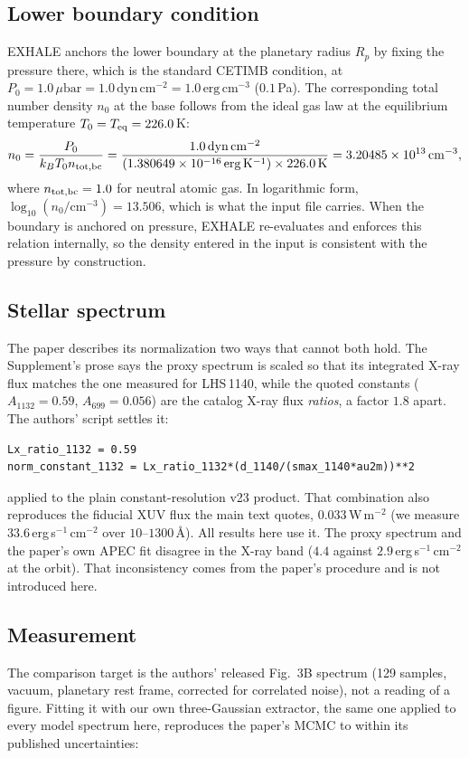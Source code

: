 \documentclass[english,a4paper]{my_memo}
\begin{document}
\subsection{Lower boundary condition}
\label{sec:base_bc}
EXHALE anchors the lower boundary at the planetary radius $R_p$ by fixing the
pressure there, which is the standard CETIMB condition, at
$P_0 = 1.0\,\mu\mathrm{bar} = 1.0\,\mathrm{dyn\,cm^{-2}} = 1.0\,\mathrm{erg\,cm^{-3}}$
($0.1$\,Pa). The corresponding total number density $n_0$ at the base follows
from the ideal gas law at the equilibrium temperature
$T_0 = T_{\rm eq} = 226.0$\,K:
\begin{equation}
  n_0 = \frac{P_0}{k_B T_0 n_{\rm tot,bc}}
      = \frac{1.0\,\mathrm{dyn\,cm^{-2}}}{(1.380649\times10^{-16}\,\mathrm{erg\,K^{-1}}) \times 226.0\,\mathrm{K}}
      = 3.20485\times 10^{13}\,\mathrm{cm^{-3}},
\end{equation}
where $n_{\rm tot,bc} = 1.0$ for neutral atomic gas. In logarithmic form,
$\log_{10}(n_0/\mathrm{cm^{-3}}) = 13.506$, which is what the input file
carries. When the boundary is anchored on pressure, EXHALE re-evaluates and
enforces this relation internally, so the density entered in the input is
consistent with the pressure by construction.

\subsection{Stellar spectrum}
\label{sec:sed}
The paper describes its normalization two ways that cannot both hold. The
Supplement's prose says the proxy spectrum is scaled so that its integrated
X-ray flux matches the one measured for LHS\,1140, while the quoted constants
($A_{1132} = 0.59$, $A_{699} = 0.056$) are the catalog X-ray flux
\emph{ratios}, a factor $1.8$ apart. The authors' script settles it:
\begin{verbatim}
Lx_ratio_1132 = 0.59
norm_constant_1132 = Lx_ratio_1132*(d_1140/(smax_1140*au2m))**2
\end{verbatim}
applied to the plain constant-resolution v23 product. That combination also
reproduces the fiducial XUV flux the main text quotes,
$0.033$\,W\,m$^{-2}$ (we measure $33.6$\,erg\,s$^{-1}$\,cm$^{-2}$ over
$10$--$1300$\,\AA{}). All results here use it. The proxy spectrum and the
paper's own APEC fit disagree in the X-ray band ($4.4$ against
$2.9$\,erg\,s$^{-1}$\,cm$^{-2}$ at the orbit). That inconsistency comes from
the paper's procedure and is not introduced here.

\subsection{Measurement}
The comparison target is the authors' released Fig.~3B spectrum (129 samples,
vacuum, planetary rest frame, corrected for correlated noise), not a reading
of a figure. Fitting it with our own three-Gaussian extractor, the same one
applied to every model spectrum here, reproduces the paper's MCMC to within
its published uncertainties:
\end{document}

